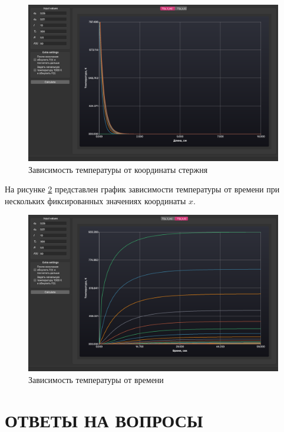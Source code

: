 \begin{figure}[H]
    \centering
    \includegraphics[scale=0.35]{img/defaultTm.png}
    \caption{Зависимость температуры от координаты стержня}
    \label{img:defaultTm}
\end{figure}

На рисунке \ref{img:defaultXn} представлен график зависимости температуры от времени при нескольких фиксированных значениях координаты $x$.

\begin{figure}[H]
    \centering
    \includegraphics[scale=0.35]{img/defaultXn.png}
    \caption{Зависимость температуры от времени}
    \label{img:defaultXn}
\end{figure}

\section{ОТВЕТЫ НА ВОПРОСЫ}

